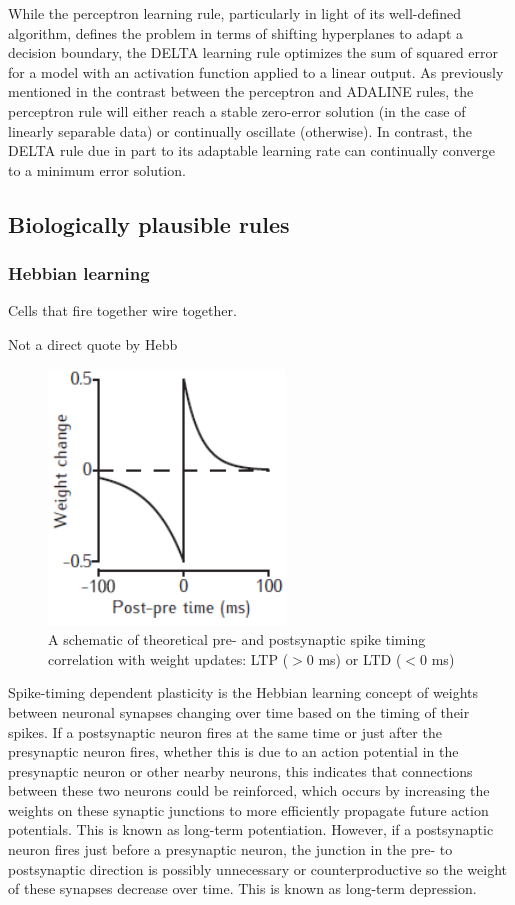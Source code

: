 \documentclass[main]{subfiles}
\begin{document}
While the perceptron learning rule, particularly in light of its well-defined algorithm, defines the problem in terms of shifting hyperplanes to adapt a decision boundary, the DELTA learning rule optimizes the sum of squared error for a model with an activation function applied to a linear output. As previously mentioned in the contrast between the perceptron and ADALINE rules, the perceptron rule will either reach a stable zero-error solution (in the case of linearly separable data) or continually oscillate (otherwise). In contrast, the DELTA rule due in part to its adaptable learning rate can continually converge to a minimum error solution.

\subsection{Biologically plausible rules}
\subsubsection{Hebbian learning}
\epigraph{Cells that fire together wire together.}{Not a direct quote by Hebb}

\begin{figure}[H]
		\centering
		\includegraphics[width=0.4\linewidth]{04_LearningRules/figures/4_2_hebbian.png}
		\caption{A schematic of theoretical pre- and postsynaptic spike timing correlation with weight updates: LTP ($>0$ ms) or LTD ($<0$ ms)}
		\label{fig:4_hebbian}
	\end{figure}

Spike-timing dependent plasticity is the Hebbian learning concept of weights between neuronal synapses changing over time based on the timing of their spikes. If a postsynaptic neuron fires at the same time or just after the presynaptic neuron fires, whether this is due to an action potential in the presynaptic neuron or other nearby neurons, this indicates that connections between these two neurons could be reinforced, which occurs by increasing the weights on these synaptic junctions to more efficiently propagate future action potentials. This is known as long-term potentiation. However, if a postsynaptic neuron fires just before a presynaptic neuron, the junction in the pre- to postsynaptic direction is possibly unnecessary or counterproductive so the weight of these synapses decrease over time. This is known as long-term depression.
\end{document}
